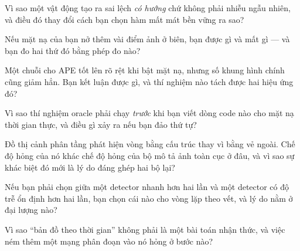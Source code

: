 \documentclass[../../deep_learning.tex]{subfiles}
\begin{document}
\begin{tukiem}
\item Vì sao một vật động tạo ra sai lệch \emph{có hướng} chứ không phải nhiễu ngẫu nhiên, và điều đó thay đổi cách bạn chọn hàm mất mát bền vững ra sao?
\item Nếu mặt nạ của bạn nở thêm vài điểm ảnh ở biên, bạn được gì và mất gì --- và bạn đo hai thứ đó bằng phép đo nào?
\item Một chuỗi cho APE tốt lên rõ rệt khi bật mặt nạ, nhưng số khung hình chính cũng giảm hẳn. Bạn kết luận được gì, và thí nghiệm nào tách được hai hiệu ứng đó?
\item Vì sao thí nghiệm oracle phải chạy \emph{trước} khi bạn viết dòng code nào cho mặt nạ thời gian thực, và điều gì xảy ra nếu bạn đảo thứ tự?
\item Đồ thị cảnh phân tầng phát hiện vòng bằng cấu trúc thay vì bằng vẻ ngoài. Chế độ hỏng của nó khác chế độ hỏng của bộ mô tả ảnh toàn cục ở đâu, và vì sao sự khác biệt đó mới là lý do đáng ghép hai bộ lại?
\item Nếu bạn phải chọn giữa một detector nhanh hơn hai lần và một detector có độ trễ ổn định hơn hai lần, bạn chọn cái nào cho vòng lặp theo vết, và lý do nằm ở đại lượng nào?
\item Vì sao ``bản đồ theo thời gian'' không phải là một bài toán nhận thức, và việc ném thêm một mạng phân đoạn vào nó hỏng ở bước nào?
\end{tukiem}

\ifSubfilesClassLoaded{\printbibliography[title={Nguồn}]}{}
\end{document}
